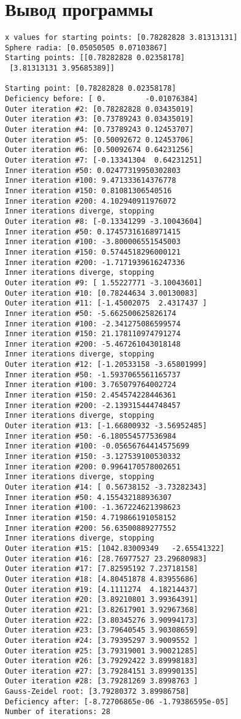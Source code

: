 \documentclass[14pt, a4paper]{article}
\begin{document}
  \section{Вывод программы}
\begin{verbatim}
x values for starting points: [0.78282828 3.81313131]
Sphere radia: [0.05050505 0.07103867]
Starting points: [[0.78282828 0.02358178]
 [3.81313131 3.95685389]]

Starting point: [0.78282828 0.02358178]
Deficiency before: [ 0.         -0.01076384]
Outer iteration #2: [0.78282828 0.03435019]
Outer iteration #3: [0.73789243 0.03435019]
Outer iteration #4: [0.73789243 0.12453707]
Outer iteration #5: [0.50092672 0.12453706]
Outer iteration #6: [0.50092674 0.64231256]
Outer iteration #7: [-0.13341304  0.64231251]
Inner iteration #50: 0.02477319950302803
Inner iteration #100: 9.471333614376778
Inner iteration #150: 0.81081306540516
Inner iteration #200: 4.102940911976072
Inner iterations diverge, stopping
Outer iteration #8: [-0.13341299 -3.10043604]
Inner iteration #50: 0.17457316168971415
Inner iteration #100: -3.800006551545003
Inner iteration #150: 0.5744518296000121
Inner iteration #200: -1.7171939616247336
Inner iterations diverge, stopping
Outer iteration #9: [ 1.55227771 -3.10043601]
Outer iteration #10: [0.78244634 3.00130083]
Outer iteration #11: [-1.45002075  2.4317437 ]
Inner iteration #50: -5.662500625826174
Inner iteration #100: -2.341275086599574
Inner iteration #150: 21.178110974791274
Inner iteration #200: -5.467261043018148
Inner iterations diverge, stopping
Outer iteration #12: [-1.20533158 -3.65801999]
Inner iteration #50: -1.5937065561165737
Inner iteration #100: 3.765079764002724
Inner iteration #150: 2.454574228446361
Inner iteration #200: -2.139315444748457
Inner iterations diverge, stopping
Outer iteration #13: [-1.66800932 -3.56952485]
Inner iteration #50: -6.180554577536984
Inner iteration #100: -0.05656764414575699
Inner iteration #150: -3.127539100530332
Inner iteration #200: 0.9964170578002651
Inner iterations diverge, stopping
Outer iteration #14: [ 0.56738152 -3.73282343]
Inner iteration #50: 4.155432188936307
Inner iteration #100: -1.367224621398623
Inner iteration #150: 4.719866191058152
Inner iteration #200: 56.63500889277552
Inner iterations diverge, stopping
Outer iteration #15: [1042.83009349   -2.65541322]
Outer iteration #16: [28.76977527 23.29680983]
Outer iteration #17: [7.82595192 7.23718158]
Outer iteration #18: [4.80451878 4.83955686]
Outer iteration #19: [4.1111274  4.18214437]
Outer iteration #20: [3.89210801 3.99364391]
Outer iteration #21: [3.82617901 3.92967368]
Outer iteration #22: [3.80345276 3.90994173]
Outer iteration #23: [3.79640545 3.90308659]
Outer iteration #24: [3.79395297 3.9009552 ]
Outer iteration #25: [3.79319001 3.90021285]
Outer iteration #26: [3.79292422 3.89998183]
Outer iteration #27: [3.79284151 3.89990135]
Outer iteration #28: [3.79281269 3.8998763 ]
Gauss-Zeidel root: [3.79280372 3.89986758]
Deficiency after: [-8.72706865e-06 -1.79386595e-05]
Number of iterations: 28



\end{verbatim}
\end{document}
